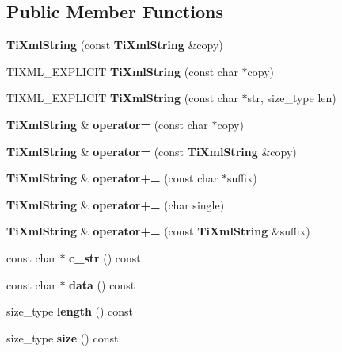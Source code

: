 \subsection*{Public Member Functions}
\begin{DoxyCompactItemize}
\item 
\mbox{\label{classTiXmlString_ac80fe17693a438c9ab2591664743fcb6}} 
{\bfseries Ti\+Xml\+String} (const \textbf{ Ti\+Xml\+String} \&copy)
\item 
\mbox{\label{classTiXmlString_aa3b32bd2891a757c9f36c21db44c81d2}} 
T\+I\+X\+M\+L\+\_\+\+E\+X\+P\+L\+I\+C\+IT {\bfseries Ti\+Xml\+String} (const char $\ast$copy)
\item 
\mbox{\label{classTiXmlString_a4b17ea5c5db986f14827223dfa8f1547}} 
T\+I\+X\+M\+L\+\_\+\+E\+X\+P\+L\+I\+C\+IT {\bfseries Ti\+Xml\+String} (const char $\ast$str, size\+\_\+type len)
\item 
\mbox{\label{classTiXmlString_ae0bc6147afc0ec2aa0da3a3c0a8fcfb0}} 
\textbf{ Ti\+Xml\+String} \& {\bfseries operator=} (const char $\ast$copy)
\item 
\mbox{\label{classTiXmlString_ab1f1f5d3eceaa0f22d0a7e6055ea81b0}} 
\textbf{ Ti\+Xml\+String} \& {\bfseries operator=} (const \textbf{ Ti\+Xml\+String} \&copy)
\item 
\mbox{\label{classTiXmlString_ab56336ac2aa2a08d24a71eb9a2b502a5}} 
\textbf{ Ti\+Xml\+String} \& {\bfseries operator+=} (const char $\ast$suffix)
\item 
\mbox{\label{classTiXmlString_a6aa09d5240470b76d54ec709e04f8c13}} 
\textbf{ Ti\+Xml\+String} \& {\bfseries operator+=} (char single)
\item 
\mbox{\label{classTiXmlString_afdcae5ea2b4d9e194dc21226b817f417}} 
\textbf{ Ti\+Xml\+String} \& {\bfseries operator+=} (const \textbf{ Ti\+Xml\+String} \&suffix)
\item 
\mbox{\label{classTiXmlString_ae2bd36349215612ebcc3cb221c30bd3d}} 
const char $\ast$ {\bfseries c\+\_\+str} () const
\item 
\mbox{\label{classTiXmlString_a0e010e1737cfc3ee885b42875171b88e}} 
const char $\ast$ {\bfseries data} () const
\item 
\mbox{\label{classTiXmlString_a5db17f8314ffe2a89df0f0eb6c2a4bf5}} 
size\+\_\+type {\bfseries length} () const
\item 
\mbox{\label{classTiXmlString_a483d85103d2a3ba8c0831e205c832f33}} 
size\+\_\+type {\bfseries size} () const
\item 
\mbox{\label{classTiXmlString_a3139aafb0f0a8e26d1a4ed58a50f3678}} 

\end{DoxyCompactItemize}
